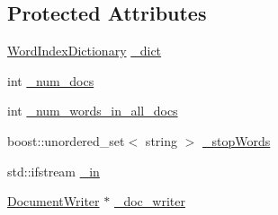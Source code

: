 \subsection*{Protected Attributes}
\begin{DoxyCompactItemize}
\item 
\hyperlink{class_word_index_dictionary}{WordIndexDictionary} \hyperlink{class_unigram___train___data___formatter_adddae72976929b052eea7fcfc9e08591}{\_\-dict}
\item 
int \hyperlink{class_unigram___train___data___formatter_a7f950a2118eaece102aaf7c7c50bbfa5}{\_\-num\_\-docs}
\item 
int \hyperlink{class_unigram___train___data___formatter_a0397b3d404743bc5211260a1d65c77af}{\_\-num\_\-words\_\-in\_\-all\_\-docs}
\item 
boost::unordered\_\-set$<$ string $>$ \hyperlink{class_unigram___train___data___formatter_a46f152f878318a6d76ddf36a40e8b232}{\_\-stopWords}
\item 
std::ifstream \hyperlink{class_unigram___train___data___formatter_a5b7f90646a209171c921cb4238fff69f}{\_\-in}
\item 
\hyperlink{class_document_writer}{DocumentWriter} $\ast$ \hyperlink{class_unigram___train___data___formatter_ae8191138ad8b3e2265dec5332ab69638}{\_\-doc\_\-writer}
\end{DoxyCompactItemize}


